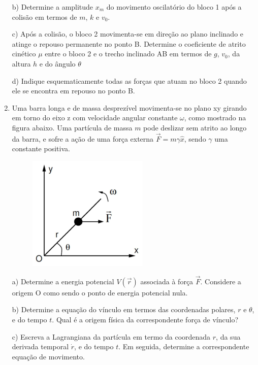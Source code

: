 \begin{enumerate}[start=1,label={\bfseries Q\arabic*.}]
\resposta


b) Determine a amplitude $x_{m}$ do movimento oscilatório do bloco 1 após a colisão em termos de $m$, $k$ e $v_{0}$.

\resposta

c) Após a colisão, o bloco 2 movimenta-se em direção ao plano inclinado e atinge o repouso permanente no ponto B. Determine o coeficiente de atrito cinético $\mu$ entre o bloco 2 e o trecho inclinado AB em termos de $g$, $v_{0}$, da altura $h$ e do ângulo $\theta$

\resposta

d) Indique esquematicamente todas as forças que atuam no bloco 2 quando ele se encontra em repouso no ponto B.

\resposta



\item Uma barra longa e de massa desprezível movimenta-se no plano xy girando em torno do eixo z com velocidade angular constante $\omega$, como mostrado na figura abaixo. Uma partícula de massa $m$ pode deslizar sem atrito ao longo da barra, e sofre a ação de uma força externa $\vec{F} = m\gamma \hat{x}$, sendo $\gamma$ uma constante positiva.

\begin{figure}[H]
\centering
\includegraphics[scale=0.8]{classica-img/barra.png}
\end{figure}



a) Determine a energia potencial $V(\vec{r})$ associada à força $\vec{F}$. Considere a origem O como sendo o ponto de energia potencial nula.

\resposta

b) Determine a equação do vínculo em termos das coordenadas polares, $r$ e $\theta$, e do tempo $t$. Qual é a origem física da correspondente força de vínculo?

\resposta

c) Escreva a Lagrangiana da partícula em termo da coordenada $r$, da sua derivada temporal $\dot{r}$, e do tempo $t$. Em seguida, determine a correspondente equação de movimento.


\end{enumerate}
